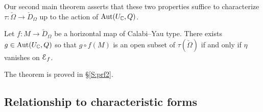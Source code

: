 \documentclass[12pt]{amsart}
\numberwithin{equation}{section}
\numberwithin{table}{section}
\numberwithin{figure}{section}
\begin{document}
\noindent Our second main theorem asserts that these two properties suffice to characterize $\tau : \check \Omega \to \check D_\Omega$ up to the action of $\mathrm{Aut}(U_\mathbb C,Q)$.

\begin{theorem} \label{T:main2}
Let $f : M \to \check D_\Omega$ be a horizontal map of Calabi--Yau type.  There exists $g \in \mathrm{Aut}(U_\mathbb C,Q)$ so that $g \circ f(M)$ is an open subset of $\tau(\check \Omega)$ if and only if $\eta$ vanishes on $\mathcal E_f$.
\end{theorem}

\noindent The theorem is proved in \S\ref{S:prf2}.

\subsection{Relationship to characteristic forms} \label{S:rel}
\end{document}
